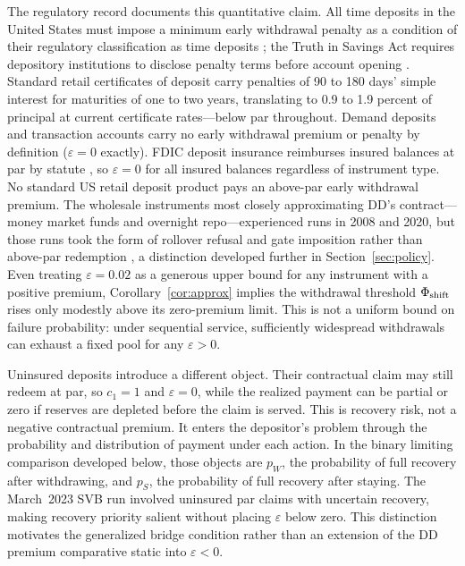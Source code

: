 \documentclass[12pt]{article}\usepackage[]{graphicx}\usepackage[]{xcolor}
\begin{document}
The regulatory record documents this quantitative claim.
All time deposits in the United States must impose a minimum early withdrawal penalty as a condition of their regulatory classification as time deposits \citep{reg_d}; the Truth in Savings Act requires depository institutions to disclose penalty terms before account opening \citep{reg_dd}.
Standard retail certificates of deposit carry penalties of 90 to 180 days' simple interest for maturities of one to two years, translating to 0.9 to 1.9 percent of principal at current certificate rates---below par throughout.
Demand deposits and transaction accounts carry no early withdrawal premium or penalty by definition ($\varepsilon = 0$ exactly).
FDIC deposit insurance reimburses insured balances at par by statute \citep{fdia_1821f}, so $\varepsilon = 0$ for all insured balances regardless of instrument type.
No standard US retail deposit product pays an above-par early withdrawal premium.
The wholesale instruments most closely approximating DD's contract---money market funds and overnight repo---experienced runs in 2008 and 2020, but those runs took the form of rollover refusal and gate imposition rather than above-par redemption \citep{gorton2012securitized}, a distinction developed further in Section~\ref{sec:policy}.
Even treating $\varepsilon = 0.02$ as a generous upper bound for any instrument with a positive premium, Corollary~\ref{cor:approx} implies the withdrawal threshold $\Phi_{\rm shift}$ rises only modestly above its zero-premium limit.
This is not a uniform bound on failure probability: under sequential service, sufficiently widespread withdrawals can exhaust a fixed pool for any $\varepsilon>0$.

Uninsured deposits introduce a different object.
Their contractual claim may still redeem at par, so $c_1=1$ and $\varepsilon=0$, while the realized payment can be partial or zero if reserves are depleted before the claim is served.
This is recovery risk, not a negative contractual premium.
It enters the depositor's problem through the probability and distribution of payment under each action.
In the binary limiting comparison developed below, those objects are $p_W$, the probability of full recovery after withdrawing, and $p_S$, the probability of full recovery after staying.
The March~2023 SVB run involved uninsured par claims with uncertain recovery, making recovery priority salient without placing $\varepsilon$ below zero.
This distinction motivates the generalized bridge condition rather than an extension of the DD premium comparative static into $\varepsilon<0$.
\end{document}
